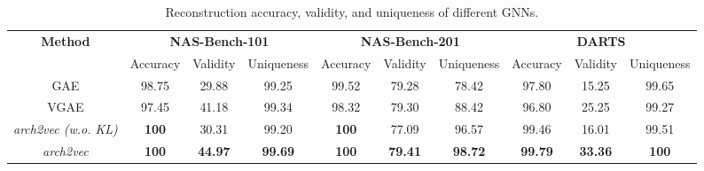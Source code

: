 \vspace{-2mm}
\begin{table}[h]
\begin{adjustbox}{width=1.01\columnwidth,center}
\scriptsize{
\begin{tabular}{cccc|ccc|ccc}
\hline
\multirow{2}{*}{\textbf{Method}} & \multicolumn{3}{c|}{\textbf{NAS-Bench-101}}  & \multicolumn{3}{c|}{\textbf{NAS-Bench-201}} & \multicolumn{3}{c}{\textbf{DARTS}}  \\ \cline{2-10} 
& Accuracy & Validity & Uniqueness & Accuracy & Validity & Uniqueness &  Accuracy & Validity & Uniqueness \\ \hline
GAE \cite{kipf2016variational}  & 98.75 & 29.88 & 99.25 &  99.52 & 79.28 & 78.42 &  97.80 & 15.25 & 99.65 \\ \hline
VGAE \cite{kipf2016variational} & 97.45 & 41.18 & 99.34 &  98.32 & 79.30 & 88.42 &  96.80 & 25.25 & 99.27 \\ \hline
\textit{arch2vec (w.o. KL)} & \textbf{100} & 30.31 & 99.20 & \textbf{100} & 77.09 & 96.57 &  99.46 & 16.01 & 99.51 \\ \hline
\textit{arch2vec} & \textbf{100} & \textbf{44.97} & \textbf{99.69} & \textbf{100} & \textbf{79.41} & \textbf{98.72} &  \textbf{99.79} & \textbf{33.36} & \textbf{100} \\ \hline
\end{tabular}
}
\end{adjustbox}
\vspace{1mm}
\caption{Reconstruction accuracy, validity, and uniqueness of different GNNs.}
\vspace{-3mm}
\label{table:pretraining}
\end{table}

















